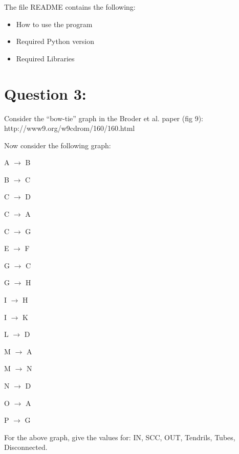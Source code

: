 \documentclass[a4paper, 11pt]{article}
\begin{document}
The file README contains the following:
\begin{itemize}
\item 
How to use the program
\item 
Required Python version
\item
Required Libraries 
\end{itemize}


\section*{Question 3:}
Consider the ``bow-tie'' graph in the Broder et al. paper (fig 9):
    http://www9.org/w9cdrom/160/160.html

    Now consider the following graph:

    A $\longrightarrow$ B
    
    B $\longrightarrow$ C
    
    C $\longrightarrow$ D
    
    C $\longrightarrow$ A
    
    C $\longrightarrow$ G
    
    E $\longrightarrow$ F
    
    G $\longrightarrow$ C
    
    G $\longrightarrow$ H
    
    I $\longrightarrow$ H
    
    I $\longrightarrow$ K
    
    L $\longrightarrow$ D
    
    M $\longrightarrow$ A
    
    M $\longrightarrow$ N
    
    N $\longrightarrow$ D
    
    O $\longrightarrow$ A
    
    P $\longrightarrow$ G 
    
    For the above graph, give the values for: IN, SCC, OUT, Tendrils, Tubes, Disconnected.
\end{document}
